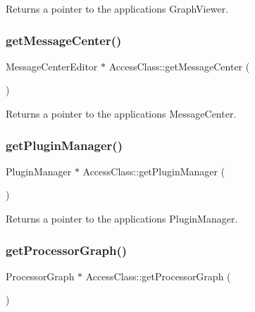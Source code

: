 Returns a pointer to the application\textquotesingle{}s Graph\+Viewer. \mbox{\label{namespace_access_class_a32785f88b52c58ae0cd1fee7857c1730}} 
\subsubsection{\texorpdfstring{get\+Message\+Center()}{getMessageCenter()}}
{\footnotesize\ttfamily Message\+Center\+Editor $\ast$ Access\+Class\+::get\+Message\+Center (\begin{DoxyParamCaption}{ }\end{DoxyParamCaption})}

Returns a pointer to the application\textquotesingle{}s Message\+Center. \mbox{\label{namespace_access_class_a23556c0c2fb931081168be89726b7419}} 
\subsubsection{\texorpdfstring{get\+Plugin\+Manager()}{getPluginManager()}}
{\footnotesize\ttfamily Plugin\+Manager $\ast$ Access\+Class\+::get\+Plugin\+Manager (\begin{DoxyParamCaption}{ }\end{DoxyParamCaption})}

Returns a pointer to the application\textquotesingle{}s Plugin\+Manager. \mbox{\label{namespace_access_class_ac50c3de3d49e5d88efb0bdef178523e7}} 
\subsubsection{\texorpdfstring{get\+Processor\+Graph()}{getProcessorGraph()}}
{\footnotesize\ttfamily Processor\+Graph $\ast$ Access\+Class\+::get\+Processor\+Graph (\begin{DoxyParamCaption}{ }\end{DoxyParamCaption})}

